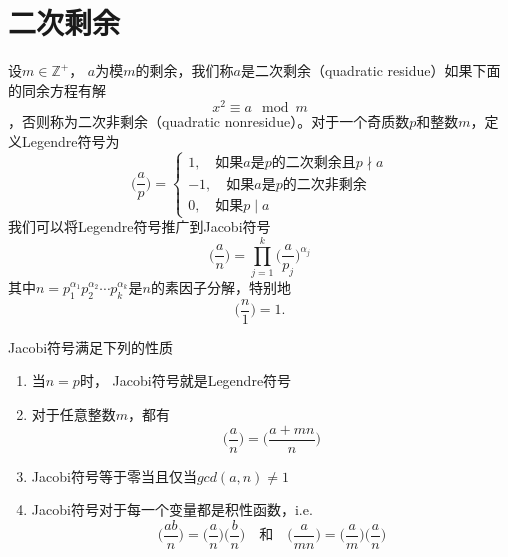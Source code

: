 \section{二次剩余}
\begin{definition}
	设$m\in \mathbb{Z}^+$， $a$为模$m$的剩余，我们称$a$是二次剩余（quadratic residue）如果下面的同余方程有解
	\begin{equation*}
		x^2 \equiv a \mod m
	\end{equation*}
	，否则称为二次非剩余（quadratic nonresidue）。对于一个奇质数$p$和整数$m$，定义Legendre符号为
	\begin{equation*}
		\Big(\frac{a}{p}\Big) = \begin{cases}
			1,\quad \text{如果$a$是$p$的二次剩余且$p\nmid a$}\\
			-1,\quad \text{如果$a$是$p$的二次非剩余}\\
			0,\quad\text{如果$p\mid a$}
		\end{cases}
	\end{equation*}
	我们可以将Legendre符号推广到Jacobi符号
	\begin{equation*}
		\Big(\frac{a}{n}\Big) = \prod\limits_{j=1}^k\Big(\frac{a}{p_j}\Big)^{\alpha_j}
	\end{equation*}
	其中$n = p_1^{\alpha_1}p_2^{\alpha_2}\cdots p_k^{\alpha_k}$是$n$的素因子分解，特别地
	\begin{equation*}
		\Big(\frac{n}{1}\Big) = 1.
	\end{equation*}
\end{definition}
\begin{proposition}
	Jacobi符号满足下列的性质
	\begin{enumerate}
		\item 当$n = p$时， Jacobi符号就是Legendre符号
		\item 对于任意整数$m$，都有
		\begin{equation*}
			\Big(\frac{a}{n}\Big) = \Big(\frac{a+mn}{n}\Big) 
		\end{equation*}
		\item Jacobi符号等于零当且仅当$gcd(a, n)\neq 1$
		\item Jacobi符号对于每一个变量都是积性函数，i.e.
		\begin{equation*}
			\Big(\frac{ab}{n}\Big) = \Big(\frac{a}{n}\Big)\Big(\frac{b}{n}\Big)\quad\text{和}\quad
			\Big(\frac{a}{mn}\Big) = \Big(\frac{a}{m}\Big)\Big(\frac{a}{n}\Big)
		\end{equation*}
	\end{enumerate}
\end{proposition}
